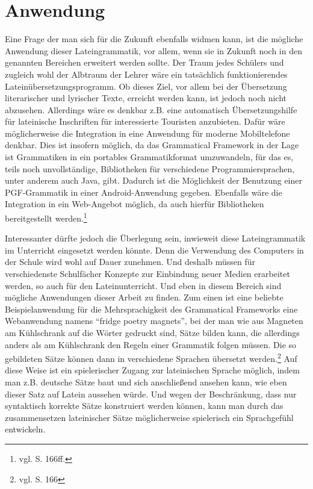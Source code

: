\section{Anwendung}
Eine Frage der man sich für die Zukunft ebenfalls widmen kann, ist die mögliche Anwendung dieser Lateingrammatik, vor allem, wenn sie in Zukunft noch in den genannten Bereichen erweitert werden sollte. Der Traum jedes Schülers und zugleich wohl der Albtraum der Lehrer wäre ein tatsächlich funktionierendes Lateinübersetzungsprogramm. Ob dieses Ziel, vor allem bei der Übersetzung literarischer und lyrischer Texte, erreicht werden kann, ist jedoch noch nicht abzusehen. Allerdings wäre es denkbar z.B. eine automatisch Übersetzungshilfe für lateinische Inschriften für interessierte Touristen anzubieten. Dafür wäre möglicherweise die Integration in eine Anwendung für moderne Mobiltelefone denkbar. Dies ist insofern möglich, da das Grammatical Framework in der Lage ist Grammatiken in ein portables Grammatikformat umzuwandeln, für das es, teils noch unvollständige, Bibliotheken für verschiedene Programmiersprachen, unter anderem auch Java, gibt. Dadurch ist die Möglichkeit der Benutzung einer PGF-Grammatik in einer Android-Anwendung gegeben. Ebenfalls wäre die Integration in ein Web-Angebot möglich, da auch hierfür Bibliotheken bereitgestellt werden.\footnote{vgl. \cite{RANTA2011} S. 166ff.} \par
Interessanter dürfte jedoch die Überlegung sein, inwieweit diese Lateingrammatik im Unterricht eingesetzt werden könnte. Denn die Verwendung des Computers in der Schule wird wohl auf Dauer zunehmen. Und deshalb müssen für verschiedenste Schulfächer Konzepte zur Einbindung neuer Medien erarbeitet werden, so auch für den Lateinunterricht. Und eben in diesem Bereich sind mögliche Anwendungen dieser Arbeit zu finden. Zum einen ist eine beliebte Beispielanwendung für die Mehrsprachigkeit des Grammatical Frameworks eine Webanwendung namens ``fridge poetry magnets'', bei der man wie aus Magneten am Kühlschrank auf die Wörter gedruckt sind, Sätze bilden kann, die allerdings anders als am Kühlschrank den Regeln einer Grammatik folgen müssen. Die so gebildeten Sätze können dann in verschiedene Sprachen übersetzt werden.\footnote{vgl. \cite{RANTA2011} S. 166} Auf diese Weise ist ein spielerischer Zugang zur lateinischen Sprache möglich, indem man z.B. deutsche Sätze baut und sich anschließend ansehen kann, wie eben dieser Satz auf Latein aussehen würde. Und wegen der Beschränkung, dass nur syntaktisch korrekte Sätze konstruiert werden können, kann man durch das zusammensetzen lateinischer Sätze möglicherweise spielerisch ein Sprachgefühl entwickeln. \par
